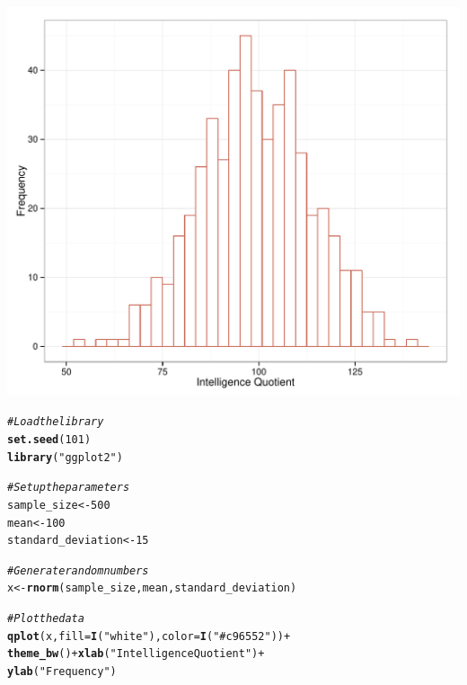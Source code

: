 \documentclass[dvipsnames]{beamer}\usepackage[]{graphicx}\usepackage[]{color}
\makeatletter
\def\maxwidth{ %
  \ifdim\Gin@nat@width>\linewidth
    \linewidth
  \else
    \Gin@nat@width
  \fi
}
\newcommand{\hlnum}[1]{\textcolor[rgb]{0.686,0.059,0.569}{#1}}%
\newcommand{\hlstr}[1]{\textcolor[rgb]{0.192,0.494,0.8}{#1}}%
\newcommand{\hlcom}[1]{\textcolor[rgb]{0.678,0.584,0.686}{\textit{#1}}}%
\newcommand{\hlopt}[1]{\textcolor[rgb]{0,0,0}{#1}}%
\newcommand{\hlstd}[1]{\textcolor[rgb]{0.345,0.345,0.345}{#1}}%
\newcommand{\hlkwb}[1]{\textcolor[rgb]{0.69,0.353,0.396}{#1}}%
\newcommand{\hlkwc}[1]{\textcolor[rgb]{0.333,0.667,0.333}{#1}}%
\newcommand{\hlkwd}[1]{\textcolor[rgb]{0.737,0.353,0.396}{\textbf{#1}}}%
\newenvironment{kframe}{%
 \def\at@end@of@kframe{}%
 \ifinner\ifhmode%
  \def\at@end@of@kframe{\end{minipage}}%
  \begin{minipage}{\columnwidth}%
 \fi\fi%
 \def\FrameCommand##1{\hskip\@totalleftmargin \hskip-\fboxsep
 \colorbox{shadecolor}{##1}\hskip-\fboxsep
     \hskip-\linewidth \hskip-\@totalleftmargin \hskip\columnwidth}%
 \MakeFramed {\advance\hsize-\width
   \@totalleftmargin\z@ \linewidth\hsize
   \@setminipage}}%
 {\par\unskip\endMakeFramed%
 \at@end@of@kframe}
\newenvironment{knitrout}{}{} %
\makeatother
\begin{document}
\begin{frame}
\begin{knitrout}
\color{fgcolor}

{\centering \includegraphics[width=\maxwidth]{figure/unnamed-chunk-2-1} 

}



\end{knitrout}
\end{frame}

\begin{frame}[fragile]
\begin{knitrout}
\color{fgcolor}\begin{kframe}
\begin{alltt}
\hlcom{# Load the library}
\hlkwd{set.seed}\hlstd{(}\hlnum{101}\hlstd{)}
\hlkwd{library}\hlstd{(}\hlstr{"ggplot2"}\hlstd{)}

\hlcom{# Set up the parameters}
\hlstd{sample_size} \hlkwb{<-} \hlnum{500}
\hlstd{mean} \hlkwb{<-} \hlnum{100}
\hlstd{standard_deviation} \hlkwb{<-} \hlnum{15}

\hlcom{# Generate random numbers}
\hlstd{x} \hlkwb{<-} \hlkwd{rnorm}\hlstd{(sample_size, mean, standard_deviation)}

\hlcom{# Plot the data}
\hlkwd{qplot}\hlstd{(x,} \hlkwc{fill} \hlstd{=} \hlkwd{I}\hlstd{(}\hlstr{"white"}\hlstd{),} \hlkwc{color} \hlstd{=} \hlkwd{I}\hlstd{(}\hlstr{"#c96552"}\hlstd{))} \hlopt{+}
  \hlkwd{theme_bw}\hlstd{()} \hlopt{+} \hlkwd{xlab}\hlstd{(}\hlstr{"Intelligence Quotient"}\hlstd{)} \hlopt{+}
  \hlkwd{ylab}\hlstd{(}\hlstr{"Frequency"}\hlstd{)}
\end{alltt}
\end{kframe}
\end{knitrout}
\end{frame}
\end{document}
